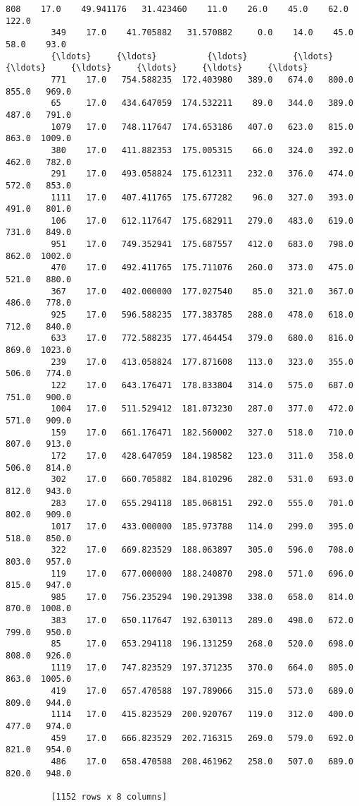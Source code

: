 \documentclass[11pt]{article}
\begin{document}
\begin{Verbatim}[commandchars=\\\{\}]
         808    17.0    49.941176   31.423460    11.0    26.0    45.0    62.0   122.0
         349    17.0    41.705882   31.570882     0.0    14.0    45.0    58.0    93.0
         {\ldots}     {\ldots}          {\ldots}         {\ldots}     {\ldots}     {\ldots}     {\ldots}     {\ldots}     {\ldots}
         771    17.0   754.588235  172.403980   389.0   674.0   800.0   855.0   969.0
         65     17.0   434.647059  174.532211    89.0   344.0   389.0   487.0   791.0
         1079   17.0   748.117647  174.653186   407.0   623.0   815.0   863.0  1009.0
         380    17.0   411.882353  175.005315    66.0   324.0   392.0   462.0   782.0
         291    17.0   493.058824  175.612311   232.0   376.0   474.0   572.0   853.0
         1111   17.0   407.411765  175.677282    96.0   327.0   393.0   491.0   801.0
         106    17.0   612.117647  175.682911   279.0   483.0   619.0   731.0   849.0
         951    17.0   749.352941  175.687557   412.0   683.0   798.0   862.0  1002.0
         470    17.0   492.411765  175.711076   260.0   373.0   475.0   521.0   880.0
         367    17.0   402.000000  177.027540    85.0   321.0   367.0   486.0   778.0
         925    17.0   596.588235  177.383785   288.0   478.0   618.0   712.0   840.0
         633    17.0   772.588235  177.464454   379.0   680.0   816.0   869.0  1023.0
         239    17.0   413.058824  177.871608   113.0   323.0   355.0   506.0   774.0
         122    17.0   643.176471  178.833804   314.0   575.0   687.0   751.0   900.0
         1004   17.0   511.529412  181.073230   287.0   377.0   472.0   571.0   909.0
         159    17.0   661.176471  182.560002   327.0   518.0   710.0   807.0   913.0
         172    17.0   428.647059  184.198582   123.0   311.0   358.0   506.0   814.0
         302    17.0   660.705882  184.810296   282.0   531.0   693.0   812.0   943.0
         283    17.0   655.294118  185.068151   292.0   555.0   701.0   802.0   909.0
         1017   17.0   433.000000  185.973788   114.0   299.0   395.0   518.0   850.0
         322    17.0   669.823529  188.063897   305.0   596.0   708.0   803.0   957.0
         119    17.0   677.000000  188.240870   298.0   571.0   696.0   815.0   947.0
         985    17.0   756.235294  190.291398   338.0   658.0   814.0   870.0  1008.0
         383    17.0   650.117647  192.630113   289.0   498.0   672.0   799.0   950.0
         85     17.0   653.294118  196.131259   268.0   520.0   698.0   808.0   926.0
         1119   17.0   747.823529  197.371235   370.0   664.0   805.0   863.0  1005.0
         419    17.0   657.470588  197.789066   315.0   573.0   689.0   809.0   944.0
         1114   17.0   415.823529  200.920767   119.0   312.0   400.0   477.0   974.0
         459    17.0   666.823529  202.716315   269.0   579.0   692.0   821.0   954.0
         486    17.0   658.470588  208.461962   258.0   507.0   689.0   820.0   948.0
         
         [1152 rows x 8 columns]
\end{Verbatim}
            
\end{document}
